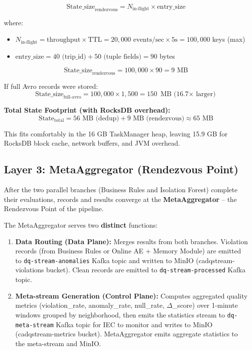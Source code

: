 \begin{equation}
\text{State\_size}_{\text{rendezvous}} = N_{\text{in-flight}} \times \text{entry\_size}
\end{equation}

where:
\begin{itemize}
    \item $N_{\text{in-flight}} = \text{throughput} \times \text{TTL} = 20{,}000 \text{ events/sec} \times 5\text{s} = 100{,}000$ keys (max)
    \item $\text{entry\_size} = 40 \text{ (trip\_id)} + 50 \text{ (tuple fields)} = 90$ bytes
\end{itemize}

\begin{equation}
\text{State\_size}_{\text{rendezvous}} = 100{,}000 \times 90 = 9 \text{ MB}
\end{equation}

If full Avro records were stored:
\begin{equation}
\text{State\_size}_{\text{full-avro}} = 100{,}000 \times 1{,}500 = 150 \text{ MB (16.7$\times$ larger)}
\end{equation}

\textbf{Total State Footprint (with RocksDB overhead):}
\begin{equation}
\text{State}_{\text{total}} = 56 \text{ MB (dedup)} + 9 \text{ MB (rendezvous)} \approx 65 \text{ MB}
\end{equation}

This fits comfortably in the 16 GB TaskManager heap, leaving 15.9 GB for RocksDB block cache, network buffers, and JVM overhead.

\subsection{Layer 3: MetaAggregator (Rendezvous Point)}

After the two parallel branches (Business Rules and Isolation Forest) complete their evaluations, records and results converge at the \textbf{MetaAggregator} -- the Rendezvous Point of the pipeline.

The MetaAggregator serves two \textbf{distinct} functions:

\begin{enumerate}
    \item \textbf{Data Routing (Data Plane):} Merges results from both branches. Violation records (from Business Rules or Online AE + Memory Module) are emitted to \texttt{dq-stream-anomalies} Kafka topic and written to MinIO (cadqstream-violations bucket). Clean records are emitted to \texttt{dq-stream-processed} Kafka topic.

    \item \textbf{Meta-stream Generation (Control Plane):} Computes aggregated quality metrics (violation\_rate, anomaly\_rate, null\_rate, $\Delta$\_score) over 1-minute windows grouped by neighborhood, then emits the statistics stream to \texttt{dq-meta-stream} Kafka topic for IEC to monitor and writes to MinIO (cadqstream-metrics bucket). MetaAggregator emits aggregate statistics to the meta-stream and MinIO.
\end{enumerate}

